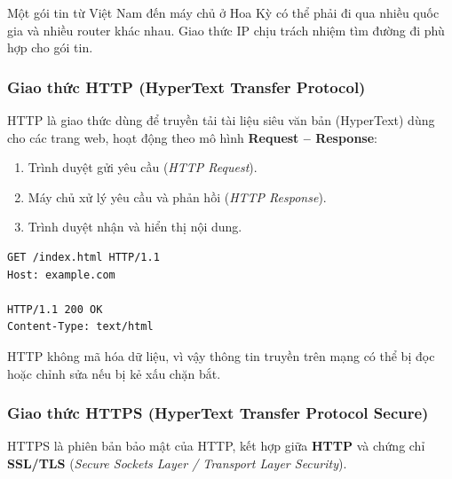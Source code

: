 \documentclass[11pt,oneside]{book}
\begin{document}
\begin{noteBox}
Một gói tin từ Việt Nam đến máy chủ ở Hoa Kỳ có thể phải đi qua nhiều quốc gia và nhiều router khác nhau. Giao thức IP chịu trách nhiệm tìm đường đi phù hợp cho gói tin.
\end{noteBox}

\subsubsection{Giao thức HTTP (HyperText Transfer Protocol)}

HTTP là giao thức dùng để truyền tải tài liệu siêu văn bản (HyperText) dùng cho các trang web, hoạt động theo mô hình \textbf{Request -- Response}:
\begin{enumerate}[label=\textbf{\arabic*.}, leftmargin=1.8em, itemsep=2pt, parsep=0pt]
    \item Trình duyệt gửi yêu cầu (\textit{HTTP Request}).
    \item Máy chủ xử lý yêu cầu và phản hồi (\textit{HTTP Response}).
    \item Trình duyệt nhận và hiển thị nội dung.
\end{enumerate}

\begin{codeWindow}
\begin{lstlisting}[language=HTTP, frame=none]
GET /index.html HTTP/1.1
Host: example.com

HTTP/1.1 200 OK
Content-Type: text/html
\end{lstlisting}
\end{codeWindow}

\begin{warnBox}
HTTP không mã hóa dữ liệu, vì vậy thông tin truyền trên mạng có thể bị đọc hoặc chỉnh sửa nếu bị kẻ xấu chặn bắt.
\end{warnBox}

\subsubsection{Giao thức HTTPS (HyperText Transfer Protocol Secure)}

HTTPS là phiên bản bảo mật của HTTP, kết hợp giữa \textbf{HTTP} và chứng chỉ \textbf{SSL/TLS} (\textit{Secure Sockets Layer / Transport Layer Security}).
\end{document}
